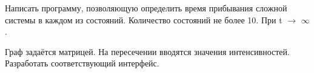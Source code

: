 Написать программу, позволяющую определить время прибывания сложной системы в каждом из состояний. Количество состояний не более 10. При t $\rightarrow$ $\infty$.

Граф задаётся матрицей. На пересечении вводятся значения интенсивностей. Разработать соответствующий интерфейс.